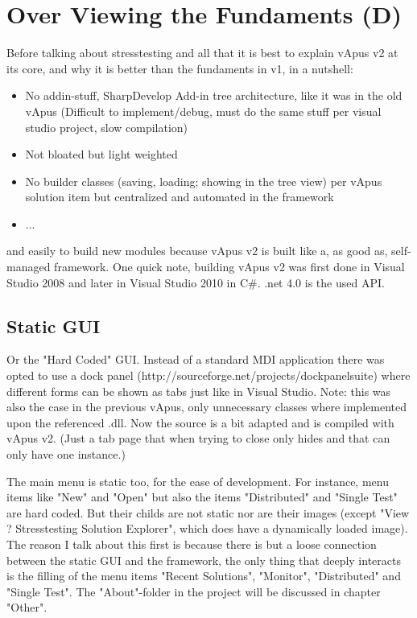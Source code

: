 \section{Over Viewing the Fundaments {\bf(D)}}
Before talking about stresstesting and all that it is best to explain vApus v2 at its core, and why it is better than the fundaments in v1, in a nutshell:
\begin{itemize}
\item No addin-stuff, SharpDevelop Add-in tree architecture, like it was in the old vApus (Difficult to implement/debug, must do the same stuff per visual studio project, slow compilation)
\item Not bloated but light weighted
\item No builder classes (saving, loading; showing in the tree view) per vApus solution item but centralized and automated in the framework
\item ...
\end{itemize}
 and easily to build new modules because vApus v2 is built like a, as good as, self-managed framework.
One quick note, building vApus v2 was first done in Visual Studio 2008 and later in Visual Studio 2010 in C\#. .net 4.0 is the used API.

\subsection{Static GUI}
Or the "Hard Coded" GUI. Instead of a standard MDI application there was opted to use a dock panel (http://sourceforge.net/projects/dockpanelsuite) where different forms can be shown as tabs just like in Visual Studio.
Note: this was also the case in the previous vApus, only unnecessary classes where implemented upon the referenced .dll. Now the source is a bit adapted and is compiled with vApus v2. (Just a tab page that when trying to close only hides and that can only have one instance.)

The main menu is static too, for the ease of development. For instance, menu items like "New" and "Open" but also the items "Distributed" and "Single Test" are hard coded.
But their childs are not static nor are their images (except "View ? Stresstesting Solution Explorer", which does have a dynamically loaded image).
The reason I talk about this first is because there is but a loose connection between the static GUI and the framework, the only thing that deeply interacts is the filling of the menu items "Recent Solutions", "Monitor",  "Distributed" and "Single Test".
The "About"-folder in the project will be discussed in chapter "Other".

